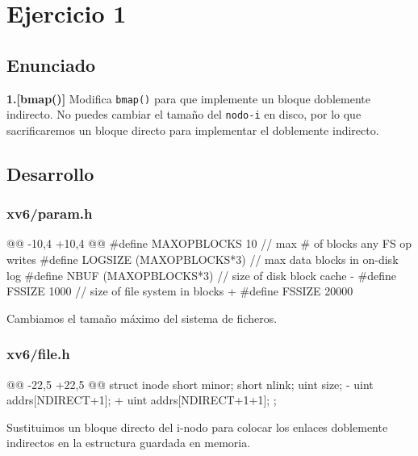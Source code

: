 \section{Ejercicio 1}
\subsection{Enunciado}
\begin{ejer}
    \textbf{1.[bmap()]} Modifica \texttt{bmap()} para que implemente un bloque doblemente indirecto. 
    No puedes cambiar el tamaño del \texttt{nodo-i} en disco, por lo que sacrificaremos un bloque directo para 
    implementar el doblemente indirecto.
\end{ejer}
\subsection{Desarrollo}
\subsubsection{xv6/param.h}

\begin{listing}
@@ -10,4 +10,4 @@
    #define MAXOPBLOCKS  10  // max # of blocks any FS op writes
    #define LOGSIZE      (MAXOPBLOCKS*3)  // max data blocks in on-disk log
    #define NBUF         (MAXOPBLOCKS*3)  // size of disk block cache
-   #define FSSIZE 1000 // size of file system in blocks
+   #define FSSIZE 20000 
\end{listing}

\par Cambiamos el tamaño máximo del sistema de ficheros.

\subsubsection{xv6/file.h}
\begin{listing}
@@ -22,5 +22,5 @@ struct inode {
    short minor;
    short nlink;
    uint size;
-   uint addrs[NDIRECT+1];
+   uint addrs[NDIRECT+1+1];
  };
\end{listing}

\par Sustituimos un bloque directo del i-nodo para colocar los enlaces
doblemente indirectos en la estructura guardada en memoria.


